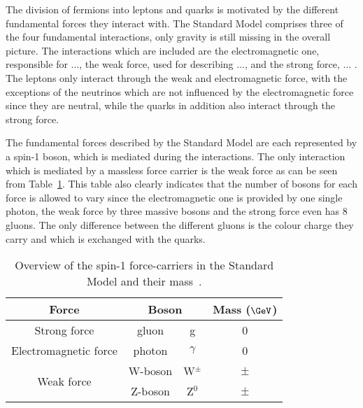 The division of fermions into leptons and quarks is motivated by the different fundamental forces they interact with. The Standard Model comprises three of the four fundamental interactions, only gravity is still missing in the overall picture. The interactions which are included are the electromagnetic one, responsible for ..., the weak force, used for describing ..., and the strong force, ... . The leptons only interact through the weak and electromagnetic force, with the exceptions of the neutrinos which are not influenced by the electromagnetic force since they are neutral, while the quarks in addition also interact through the strong force. 

The fundamental forces described by the Standard Model are each represented by a spin-1 boson, which is mediated during the interactions.
The only interaction which is mediated by a massless force carrier is the weak force as can be seen from Table~\ref{table::ForceCarriers}.
This table also clearly indicates that the number of bosons for each force is allowed to vary since the electromagnetic one is provided by one single photon, the weak force by three massive bosons and the strong force even has 8 gluons. The only difference between the different gluons is the colour charge they carry and which is exchanged with the quarks.

\begin{table}[h!t]
 \centering
 \caption{Overview of the spin-1 force-carriers in the Standard Model and their mass~\cite{WMass,ZMass}.} \label{table::ForceCarriers}
 \begin{tabular}{|c|cc|c|}%
  \hline
  \textbf{Force} 		&\multicolumn{2}{c|}{\textbf{Boson}} 	& \textbf{Mass ($\GeV$)}	\\%
  \hline
  Strong force 			& gluon 	& g 			& 0 				\\%
  \hline
  Electromagnetic force		& photon 	& $\gamma$ 		& 0 				\\%
  \hline
  \multirow{2}{*}{Weak force} 	& W-boson 	& W$^{\pm}$ 		& $\pm$ 			\\%
				& Z-boson 	& Z$^{0}$ 		& $\pm$ 			\\%
  \hline
 \end{tabular}
\end{table}


